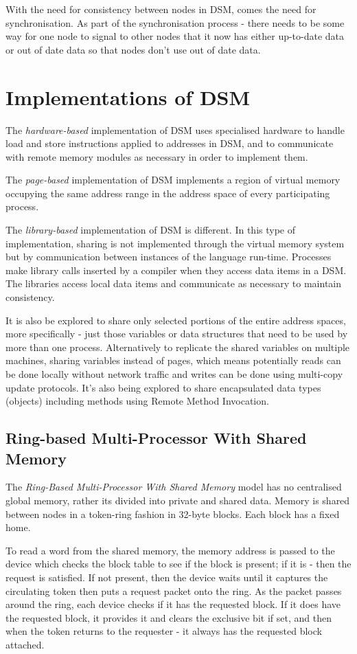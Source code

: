 With the need for consistency between nodes in DSM, comes the need for synchronisation. As part of the synchronisation process - there needs to be some way for one node to signal to other nodes that it now has either up-to-date data or out of date data so that nodes don't use out of date data.

\section{Implementations of DSM}
The \textit{hardware-based} implementation of DSM uses specialised hardware to handle load and store instructions applied to addresses in DSM, and to communicate with remote memory modules as necessary in order to implement them.

The \textit{page-based} implementation of DSM implements a region of virtual memory occupying the same address range in the address space of every participating process. 

The \textit{library-based} implementation of DSM is different. In this type of implementation, sharing is not implemented through the virtual memory system but by communication between instances of the language run-time. Processes make library calls inserted by a compiler when they access data items in a DSM. The libraries access local data items and communicate as necessary to maintain consistency. 

It is also be explored to share only selected portions of the entire address spaces, more specifically - just those variables or data structures that need to be used by more than one process. Alternatively to replicate the shared variables on multiple machines, sharing variables instead of pages, which means potentially reads can be done locally without network traffic and writes can be done using multi-copy update protocols. It's also being explored to share encapsulated data types (objects) including methods using Remote Method Invocation. 

\subsection{Ring-based Multi-Processor With Shared Memory}
The \textit{Ring-Based Multi-Processor With Shared Memory} model has no centralised global memory, rather its divided into private and shared data. Memory is shared between nodes in a token-ring fashion in 32-byte blocks. Each block has a fixed home. 

To read a word from the shared memory, the memory address is passed to the device which checks the block table to see if the block is present; if it is - then the request is satisfied. If not present, then the device waits until it captures the circulating token then puts a request packet onto the ring. As the packet passes around the ring, each device checks if it has the requested block. If it does have the requested block, it provides it and clears the exclusive bit if set, and then when the token returns to the requester - it always has the requested block attached. 

